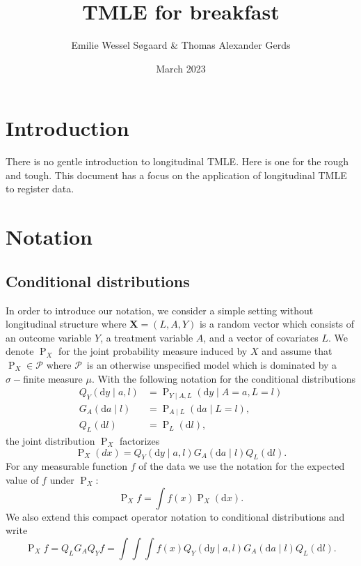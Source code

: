 \documentclass{article}
\title{TMLE for breakfast}
\author{Emilie Wessel S{\o}gaard \& Thomas Alexander Gerds}
\date{March 2023}
\newcommand{\X}[1]{X(#1)}
\newcommand{\modelx}{\ensuremath{\mathcal{P}}}
\newcommand{\distx}{\ensuremath{\P_{X}}}
\renewcommand{\X}{\ensuremath{\mathbf{X}}}
\renewcommand{\P}{\ensuremath{\operatorname{P}}}
\renewcommand{\d}{\ensuremath{\mathrm{d}}}
\begin{document}
\maketitle

\section{Introduction}

There is no gentle introduction to longitudinal TMLE. Here is one for
the rough and tough. This document has a focus on the application of
longitudinal TMLE to register data.
\section{Notation}

\subsection{Conditional distributions}

In order to introduce our notation, we consider a simple setting
without longitudinal structure where $\X=(L,A,Y)$ is a random vector
which consists of an outcome variable \(Y\), a treatment variable
\(A\), and a vector of covariates \(L\). We denote \(\distx\) for the
joint probability measure induced by \(X\) and assume that
$\P_X\in\modelx $ where \modelx\ is an otherwise unspecified model
which is dominated by a \(\sigma-\)finite measure $\mu$. With the
following notation for the conditional distributions
\begin{align*}
    Q_Y(\d y\mid a,l)&=\P_{Y\mid A, L}(\d y\mid A=a, L = l)\\
    G_A(\d a\mid l)&=\P_{A\mid L}(\d a\mid L = l),\\
    Q_L(\d l)&=\P_L(\d l),
\end{align*}
the joint distribution $\distx$ factorizes
\begin{equation*}\distx(dx)=Q_Y(\d y\mid a,l)G_A(\d a\mid l)Q_L(\d l).\end{equation*}
For any measurable function \(f\) of the data we use the notation for
the expected value of \(f\) under \(\distx\):
\begin{equation*}
\distx f=\int f(x)\distx(\d x). 
\end{equation*}
We also extend this compact operator notation to conditional
distributions and write
\begin{equation*}
\distx f=Q_LG_AQ_Yf=\int\int\int f(x)Q_Y(\d y\mid a,l)G_A(\d a\mid l)Q_L(\d l).
\end{equation*}
\end{document}
